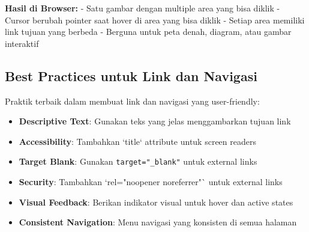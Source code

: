 \textbf{Hasil di Browser:}
- Satu gambar dengan multiple area yang bisa diklik
- Cursor berubah pointer saat hover di area yang bisa diklik
- Setiap area memiliki link tujuan yang berbeda
- Berguna untuk peta denah, diagram, atau gambar interaktif

\subsection{Best Practices untuk Link dan Navigasi}

Praktik terbaik dalam membuat link dan navigasi yang user-friendly:

\begin{itemize}
  \item \textbf{Descriptive Text}: Gunakan teks yang jelas menggambarkan tujuan link
  \item \textbf{Accessibility}: Tambahkan `title` attribute untuk screen readers
  \item \textbf{Target Blank}: Gunakan \texttt{target="\_blank"} untuk external links
  \item \textbf{Security}: Tambahkan `rel="noopener noreferrer"` untuk external links
  \item \textbf{Visual Feedback}: Berikan indikator visual untuk hover dan active states
  \item \textbf{Consistent Navigation}: Menu navigasi yang konsisten di semua halaman
\end{itemize}

